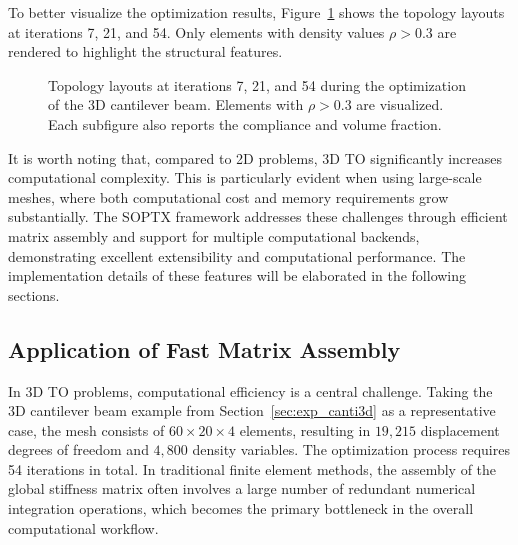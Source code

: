 \documentclass[mathpazo]{cicp}
\begin{document}
To better visualize the optimization results, Figure~\ref{fig:canti3d_all} shows the topology layouts at iterations 7, 21, and 54. Only elements with density values $\rho > 0.3$ are rendered to highlight the structural features.
\begin{figure}[htp]
	\centering
	\caption{Topology layouts at iterations 7, 21, and 54 during the optimization of the 3D cantilever beam. Elements with $\rho > 0.3$ are visualized. Each subfigure also reports the compliance and volume fraction.}
	\label{fig:canti3d_all}
\end{figure}

It is worth noting that, compared to 2D problems, 3D TO significantly increases computational complexity. This is particularly evident when using large-scale meshes, where both computational cost and memory requirements grow substantially. The SOPTX framework addresses these challenges through efficient matrix assembly and support for multiple computational backends, demonstrating excellent extensibility and computational performance. The implementation details of these features will be elaborated in the following sections.

\subsection{Application of Fast Matrix Assembly}
In 3D TO problems, computational efficiency is a central challenge. Taking the 3D cantilever beam example from Section~\ref{sec:exp_canti3d} as a representative case, the mesh consists of $60\times20\times4$ elements, resulting in $19,215$ displacement degrees of freedom and $4,800$ density variables. The optimization process requires 54 iterations in total. In traditional finite element methods, the assembly of the global stiffness matrix often involves a large number of redundant numerical integration operations, which becomes the primary bottleneck in the overall computational workflow.
\end{document}
